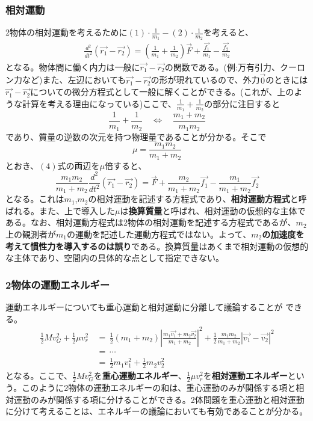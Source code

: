 \documentclass[dvipdfmx,11pt]{jsarticle}
\begin{document}
\subsubsection*{相対運動}
2物体の相対運動を考えるために$(1)\cdot\frac{1}{m_1}-(2)\cdot\frac{1}{m_2}$を考えると、
{\large
\begin{eqnarray}
    \frac{d^2}{dt^2}\left(\vec{r_1}-\vec{r_2}\right)=\left(\frac{1}{m_1}+\frac{1}{m_2}\right)\vec{F}+\frac{\vec{f_1}}{m_1}-\frac{\vec{f_2}}{m_2}
\end{eqnarray}
}
となる。物体間に働く内力は一般に$\vec{r_1}-\vec{r_2}$の関数である。(例:万有引力、クーロン力など)また、左辺においても$\vec{r_1}-\vec{r_2}$の形が現れているので、外力$\vec{0}$のときには$\vec{r_1}-\vec{r_2}$についての微分方程式として一般に解くことができる。(これが、上のような計算を考える理由になっている)ここで、$\frac{1}{m_1}+\frac{1}{m_2}$の部分に注目すると
{\large
\begin{equation*}
    \frac{1}{m_1}+\frac{1}{m_2}\quad\Longleftrightarrow\quad\frac{m_1+m_2}{m_1m_2}
\end{equation*}
}
であり、質量の逆数の次元を持つ物理量であることが分かる。そこで
{\large
\begin{equation*}
    \mu=\frac{m_1m_2}{m_1+m_2}
\end{equation*}
}
とおき、$(4)$式の両辺を$\mu$倍すると、
{\large
\begin{equation}
    \frac{m_1m_2}{m_1+m_2}\frac{d^2}{dt^2}(\vec{r_1}-\vec{r_2}) = \vec{F}+\frac{m_2}{m_1+m_2}\vec{f_1}-\frac{m_1}{m_1+m_2}\vec{f_2}
\end{equation}
}
となる。これは$m_1$,$m_2$の相対運動を記述する方程式であり、{\bf 相対運動方程式}と呼ばれる。また、上で導入した$\mu$は{\bf 換算質量}と呼ばれ、相対運動の仮想的な主体である。なお、相対運動方程式は2物体の相対運動を記述する方程式であるが、$m_2$上の観測者が$m_1$の運動を記述した運動方程式ではない。よって、{\bf $m_2$の加速度を考えて慣性力を導入するのは誤り}である。換算質量はあくまで相対運動の仮想的な主体であり、空間内の具体的な点として指定できない。

\subsubsection*{2物体の運動エネルギー}
運動エネルギーについても重心運動と相対運動に分離して議論することが  できる。
{\large
\begin{align}
    \frac{1}{2}Mv_G^2+\frac{1}{2}\mu v_r^2\, & =\,\frac{1}{2}(m_1+m_2)\left|\frac{m_1\vec{v_1}+m_2\vec{v_2}}{m_1+m_2}\right|^2+\frac{1}{2}\frac{m_1m_2}{m_1+m_2}\left|\vec{v_1}-\vec{v_2}\right|^2\nonumber
    \\\,&=\,\cdots\nonumber
    \\\,&=\,\frac{1}{2}m_1v_1^2+\frac{1}{2}m_2v_2^2
\end{align}
}
となる。ここで、$\frac{1}{2}Mv_G^2$を{\bf 重心運動エネルギー}、$\frac{1}{2}\mu v_r^2$を{\bf 相対運動エネルギー}という。このように2物体の運動エネルギーの和は、重心運動のみが関係する項と相対運動のみが関係する項に分けることができる。2体問題を重心運動と相対運動に分けて考えることは、エネルギーの議論においても有効であることが分かる。
\end{document}
